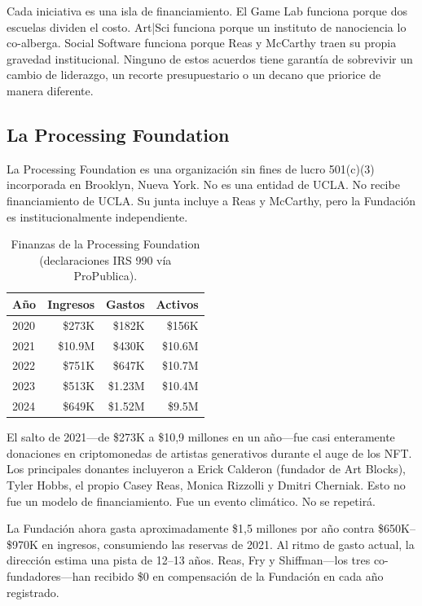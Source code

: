 \documentclass[10pt,letterpaper,twocolumn]{article}
\begin{document}
Cada iniciativa es una isla de financiamiento. El Game Lab funciona porque dos escuelas dividen el costo. Art|Sci funciona porque un instituto de nanociencia lo co-alberga. Social Software funciona porque Reas y McCarthy traen su propia gravedad institucional. Ninguno de estos acuerdos tiene garantía de sobrevivir un cambio de liderazgo, un recorte presupuestario o un decano que priorice de manera diferente.

\subsection{La Processing Foundation}

La Processing Foundation es una organización sin fines de lucro 501(c)(3) incorporada en Brooklyn, Nueva York. No es una entidad de UCLA. No recibe financiamiento de UCLA. Su junta incluye a Reas y McCarthy, pero la Fundación es institucionalmente independiente.

\begin{table}[h]
\small
\centering
\begin{tabularx}{\columnwidth}{Xrrr}
\toprule
\textbf{Año} & \textbf{Ingresos} & \textbf{Gastos} & \textbf{Activos} \\
\midrule
2020 & \$273K & \$182K & \$156K \\
2021 & \$10.9M & \$430K & \$10.6M \\
2022 & \$751K & \$647K & \$10.7M \\
2023 & \$513K & \$1.23M & \$10.4M \\
2024 & \$649K & \$1.52M & \$9.5M \\
\bottomrule
\end{tabularx}
\caption{Finanzas de la Processing Foundation (declaraciones IRS 990 vía ProPublica).}
\label{tab:pf-financials}
\end{table}

El salto de 2021---de \$273K a \$10,9 millones en un año---fue casi enteramente donaciones en criptomonedas de artistas generativos durante el auge de los NFT. Los principales donantes incluyeron a Erick Calderon (fundador de Art Blocks), Tyler Hobbs, el propio Casey Reas, Monica Rizzolli y Dmitri Cherniak. Esto no fue un modelo de financiamiento. Fue un evento climático. No se repetirá.

La Fundación ahora gasta aproximadamente \$1,5 millones por año contra \$650K--\$970K en ingresos, consumiendo las reservas de 2021. Al ritmo de gasto actual, la dirección estima una pista de 12--13 años. Reas, Fry y Shiffman---los tres co-fundadores---han recibido \$0 en compensación de la Fundación en cada año registrado.
\end{document}
